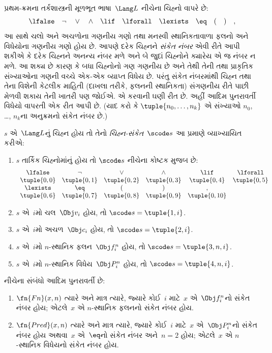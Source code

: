 પ્રથમ-ક્રમના તર્કશાસ્ત્રની મૂળભૂત ભાષા~$\Lang L$
નીચેના ચિહ્નો વાપરે છે:
\[
\lfalse \quad \lnot \quad \lor \quad \land \quad \lif \quad \lforall
\quad \lexists \quad \eq \quad ( \quad ) \quad ,
\]
આ સાથે ચલો અને અચળોના
ગણનીય ગણો તથા મનસ્વી સ્થાનિકતાવાળા
ફલનો અને વિધેયોના
ગણનીય ગણો હોય છે. આપણે દરેક
ચિહ્નને \emph{સંકેત નંબર} એવી રીતે આપી
શકીએ કે દરેક ચિહ્નને અનન્ય નંબર મળે અને
બે જુદાં ચિહ્નોને ક્યારેય એ જ નંબર ન મળે.
આ શક્ય છે કારણ કે બધા ચિહ્નોનો ગણ
ગણનીય છે અને તેથી તેની તથા
પ્રાકૃતિક સંખ્યાઓના ગણની વચ્ચે
એક-એક વ્યાપ્ત વિધેય છે. પરંતુ સંકેત નંબરમાંથી
ચિહ્ન તથા તેના વિશેની કેટલીક માહિતી
(દાખલા તરીકે, ફલનની સ્થાનિકતા)
સંગણનીય રીતે પાછી મેળવી શકાય તેની
ખાતરી પણ જોઈએ. એ કરવાની ઘણી રીત છે.
અહીં આદિમ પુનરાવર્તી વિધેયો વાપરતી
એક રીત આપી છે. (યાદ કરો કે
$\tuple{n_0, \dots, n_k}$ એ સંખ્યાઓ
$n_0$, \dots, $n_k$ના અનુક્રમનો સંકેત
નંબર છે.)

\begin{defn}
$s$ એ~$\Lang L$નું ચિહ્ન હોય તો
તેનો \emph{ચિહ્ન-સંકેત}~$\scode s$
આ પ્રમાણે વ્યાખ્યાયિત કરીએ:
\begin{enumerate}
\item $s$ તાર્કિક ચિહ્નોમાંનું હોય તો
  $\scode s$ નીચેના કોષ્ટક મુજબ છે:
\[
\begin{array}{cccccccccc}
  \lfalse & \lnot & \lor & \land & \lif & \lforall \\
\tuple{0, 0} & \tuple{0, 1} & \tuple{0, 2} & \tuple{0, 3} &
\tuple{0, 4} & \tuple{0, 5} \\
\lexists & \eq & ( & ) & ,\\
\tuple{0, 6} & \tuple{0, 7} &
\tuple{0, 8} & \tuple{0, 9} & \tuple{0, 10}
\end{array}
\]
\item $s$ એ~$i$મો ચલ~$\Obj v_i$ હોય, તો $\scode s = \tuple{1, i}$.
\item $s$ એ~$i$મો અચળ~$\Obj c_i$ હોય, તો
  $\scode s = \tuple{2, i}$.
\item $s$ એ~$i$મો $n$-સ્થાનિક ફલન~$\Obj f_i^n$ હોય, તો
  $\scode s = \tuple{3, n, i}$.
\item $s$ એ~$i$મો $n$-સ્થાનિક વિધેય~$\Obj P_i^n$ હોય, તો
  $\scode s = \tuple{4, n, i}$.
\end{enumerate}
\end{defn}

\begin{prop}
નીચેના સંબંધો આદિમ પુનરાવર્તી છે:
\begin{enumerate}
\item $\fn{Fn}(x, n)$ ત્યારે અને માત્ર ત્યારે,
  જ્યારે કોઈ~$i$ માટે~$x$ એ~$\Obj f^n_i$નો
  સંકેત નંબર હોય; એટલે~$x$ એ $n$-સ્થાનિક
  ફલનનો સંકેત નંબર હોય.
\item $\fn{Pred}(x, n)$ ત્યારે અને માત્ર ત્યારે,
  જ્યારે કોઈ~$i$ માટે~$x$ એ~$\Obj P^n_i$નો
  સંકેત નંબર હોય અથવા~$x$ એ~$\eq$નો
  સંકેત નંબર અને~$n = 2$ હોય; એટલે~$x$
  એ $n$-સ્થાનિક વિધેયનો સંકેત
  નંબર હોય.
\end{enumerate}
\end{prop}

